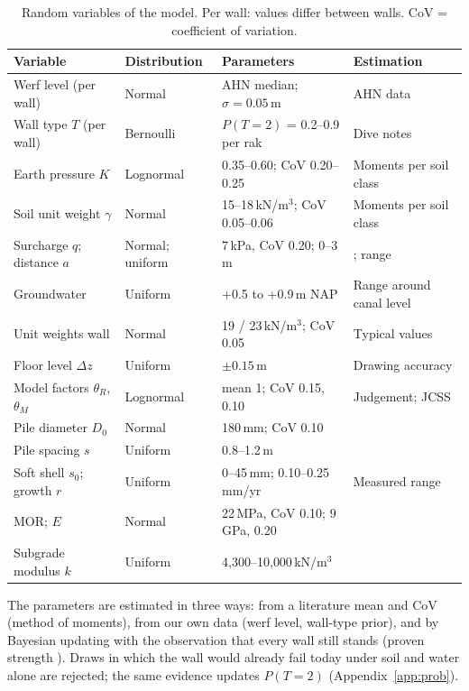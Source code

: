 \begin{table}[htbp]
\centering
\small
\caption{Random variables of the model. Per wall: values differ between
walls. CoV = coefficient of variation.}
\label{tab:prob-variables}
\begin{tabularx}{\textwidth}{@{}l l l >{\raggedright\arraybackslash}X@{}}
\toprule
Variable & Distribution & Parameters & Estimation \\
\midrule
Werf level (per wall) & Normal & AHN median; $\sigma = 0.05$\,m & AHN data \\
Wall type $T$ (per wall) & Bernoulli & $P(T{=}2)$ = 0.2--0.9 per rak & Dive notes \cite{tno2009} \\
Earth pressure $K$ & Lognormal & 0.35--0.60; CoV 0.20--0.25 & Moments per soil class \\
Soil unit weight $\gamma$ & Normal & 15--18\,kN/m$^3$; CoV 0.05--0.06 & Moments per soil class \\
Surcharge $q$; distance $a$ & Normal; uniform & 7\,kPa, CoV 0.20; 0--3\,m & \cite{hemel2024}; range \\
Groundwater & Uniform & +0.5 to +0.9\,m NAP & Range around canal level \\
Unit weights wall & Normal & 19 / 23\,kN/m$^3$; CoV 0.05 & Typical values \\
Floor level $\Delta z$ & Uniform & $\pm 0.15$\,m & Drawing accuracy \\
Model factors $\theta_R$, $\theta_M$ & Lognormal & mean 1; CoV 0.15, 0.10 & Judgement; JCSS \cite{jcss2001} \\
Pile diameter $D_0$ & Normal & 180\,mm; CoV 0.10 & \cite{ibu2010,hemel2023} \\
Pile spacing $s$ & Uniform & 0.8--1.2\,m & \cite{ibu2010} \\
Soft shell $s_0$; growth $r$ & Uniform & 0--45\,mm; 0.10--0.25\,mm/yr & Measured range \cite{hemel2023} \\
MOR; $E$ & Normal & 22\,MPa, CoV 0.10; 9\,GPa, 0.20 & \cite{hemel2023} \\
Subgrade modulus $k$ & Uniform & 4{,}300--10{,}000\,kN/m$^3$ & \cite{hemel2023} \\
\bottomrule
\end{tabularx}
\end{table}

The parameters are estimated in three ways: from a literature mean and CoV
(method of moments), from our own data (werf level, wall-type prior), and by
Bayesian updating with the observation that every wall still stands (proven
strength \cite{hemel2024}). Draws in which the wall would already fail today
under soil and water alone are rejected; the same evidence updates
$P(T{=}2)$ (Appendix~\ref{app:prob}).


